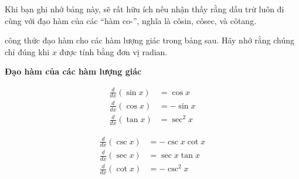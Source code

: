 \noindent
\begin{minipage}[t]{0.26\textwidth}
  \vspace*{28pt}
  \begin{flushleft}
    \fontsize{8.5}{11.5}\selectfont
    Khi bạn ghi nhớ bảng này, sẽ rất hữu ích nếu nhận thấy rằng dấu trừ luôn đi cùng với đạo hàm của các ``hàm co-'', nghĩa là côsin, côsec, và côtang.
  \end{flushleft}
\end{minipage}%
\hfill
\begin{minipage}[t]{0.70\textwidth}
  \fontsize{9.5}{13.5}\selectfont
  công thức đạo hàm cho các hàm lượng giác trong bảng sau. Hãy nhớ rằng chúng chỉ đúng khi $x$ được tính bằng đơn vị radian.

  \vspace{6pt}
  \begin{tcolorbox}[
    enhanced,
    colback=white,
    colframe=stewartred,
    boxrule=0.8pt,
    arc=0mm,
    left=15pt,
    right=15pt,
    top=8pt,
    bottom=10pt
  ]
    {\color{stewartred}\bfseries\textsf{\fontsize{10.5}{13}\selectfont Đạo hàm của các hàm lượng giác}}
    \vspace{0.25cm}
    
    \noindent
    \begin{minipage}[t]{0.46\textwidth}
      \begin{align*}
        \frac{d}{dx}(\sin x) &= \cos x\\[9pt]
        \frac{d}{dx}(\cos x) &= -\sin x\\[9pt]
        \frac{d}{dx}(\tan x) &= \sec^2 x
      \end{align*}
    \end{minipage}%
    \hfill
    \begin{minipage}[t]{0.50\textwidth}
      \begin{align*}
        \frac{d}{dx}(\csc x) &= -\csc x \cot x\\[9pt]
        \frac{d}{dx}(\sec x) &= \sec x \tan x\\[9pt]
        \frac{d}{dx}(\cot x) &= -\csc^2 x
      \end{align*}
    \end{minipage}
  \end{tcolorbox}
\end{minipage}

\vspace{10pt}

